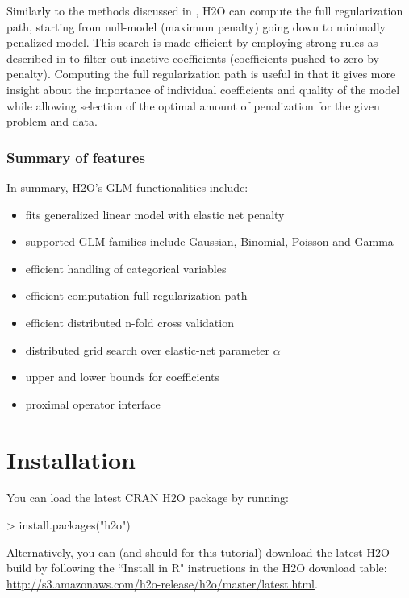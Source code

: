 \documentclass{article}[11pt]
\begin{document}
Similarly to the methods discussed in , H2O can compute the full regularization path, starting from null-model (maximum penalty) going down to minimally penalized model. This search is made efficient by employing strong-rules as described in  to filter out inactive coefficients (coefficients pushed to zero by penalty). Computing the full regularization path is useful in that it gives more insight about the importance of individual coefficients and quality of the model while allowing selection of the optimal amount of penalization for the given problem and data.


\subsubsection{Summary of features} 
In summary, H2O's GLM functionalities include:

\begin{itemize} 
\item fits generalized linear model with elastic net penalty
\item supported GLM families include Gaussian, Binomial, Poisson and Gamma
\item efficient handling of categorical variables
\item efficient computation full regularization path
\item efficient distributed n-fold cross validation
\item distributed grid search over elastic-net parameter $\alpha$
\item upper and lower bounds for coefficients
\item proximal operator interface
\end{itemize}



\section{Installation} 

You can load the latest CRAN H2O package by running:

\begin{spverbatim}
> install.packages("h2o")
\end{spverbatim}
\bigskip
\noindent
Alternatively, you can (and should for this tutorial) download the latest H2O build by following the ``Install in R" instructions in the H2O download table:
{\url{http://s3.amazonaws.com/h2o-release/h2o/master/latest.html}}.
\end{document}
